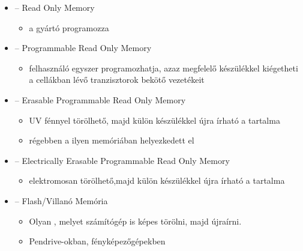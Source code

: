 \documentclass[../main.tex]{subfiles}
\begin{document}
\begin{itemize}
  \item {} \tabto{1.7cm} – \tabto{2.5cm}
        Read Only Memory
        \begin{itemize}
          \item a gyártó programozza
        \end{itemize}

  \item {} \tabto{1.7cm} – \tabto{2.5cm}
        Programmable Read Only Memory
        \begin{itemize}
          \item felhasználó egyszer programozhatja,
                azaz megfelelő készülékkel kiégetheti
                a cellákban lévő tranzisztorok bekötő vezetékeit
        \end{itemize}

  \item {} \tabto{1.7cm} – \tabto{2.5cm}
        Erasable Programmable Read Only Memory
        \begin{itemize}
          \item UV fénnyel törölhető, majd külön
                készülékkel újra írható a tartalma

          \item régebben a  ilyen
                memóriában helyezkedett el
        \end{itemize}

  \item {} \tabto{1.7cm} – \tabto{2.5cm}
        Electrically Erasable Programmable Read Only Memory
        \begin{itemize}
          \item elektromosan törölhető,majd külön
                készülékkel újra írható a tartalma
        \end{itemize}

  \item {} \tabto{1.7cm} – \tabto{2.5cm}
        Flash/Villanó Memória
        \begin{itemize}
          \item Olyan , melyet számítógép
                is képes törölni, majd újraírni.

          \item Pendrive-okban, fényképezőgépekben
        \end{itemize}
\end{itemize}
\end{document}
